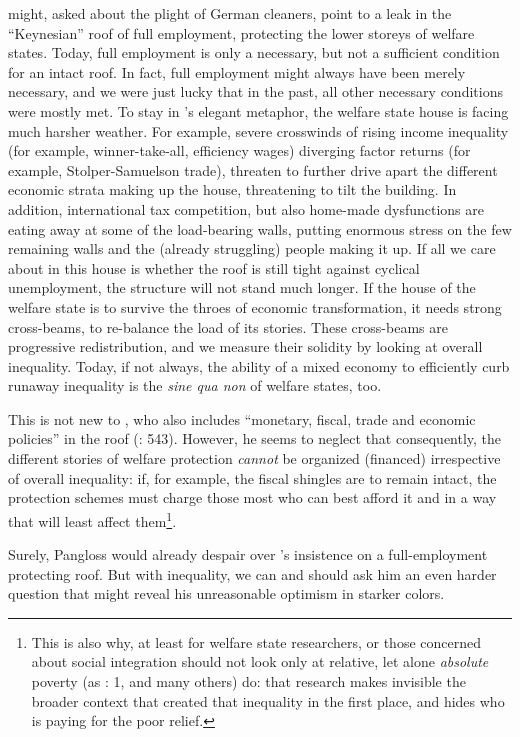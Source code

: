 \begin{enumerate}
	\citeauthor{Offe2003} might, asked about the plight of German cleaners, point to a leak in the ``Keynesian'' roof of full employment, protecting the lower storeys of welfare states. Today, full employment is only a necessary, but not a sufficient condition for an intact roof. In fact, full employment might always have been merely necessary, and we were just lucky that in the past, all other necessary conditions were mostly met. To stay in \citeauthor{Offe2003}'s elegant metaphor, the welfare state house is facing much harsher weather. For example, severe crosswinds of rising income inequality (for example, winner-take-all, efficiency wages) diverging factor returns (for example, Stolper-Samuelson trade), threaten to further drive apart the different economic strata making up the house, threatening to tilt the building. In addition, international tax competition, but also home-made dysfunctions are eating away at some of the load-bearing walls, putting enormous stress on the few remaining walls and the (already struggling) people making it up. If all we care about in this house is whether the roof is still tight against cyclical unemployment, the structure will not stand much longer. If the house of the welfare state is to survive the throes of economic transformation, it needs strong cross-beams, to re-balance the load of its stories. These cross-beams are progressive redistribution, and we measure their solidity by looking at overall inequality. Today, if not always, the ability of a mixed economy to efficiently curb runaway inequality is the \emph{sine qua non} of welfare states, too. 
	
	This is not new to \cite{Offe2003}, who also includes ``monetary, fiscal, trade and economic policies'' in the roof (\citeyear{Offe2003}: 543). However, he seems to neglect that consequently, the different stories of welfare protection \emph{cannot} be organized (financed) irrespective of overall inequality: if, for example, the fiscal shingles are to remain intact, the protection schemes must charge those most who can best afford it and in a way that will least affect them\footnote{
		This is also why, at least for welfare state researchers, or those concerned about social integration should not look only at relative, let alone \emph{absolute} poverty (as \citealt{Grow2005}: 1, and many others) do: that research makes invisible the broader context that created that inequality in the first place, and hides who is paying for the poor relief.}. 
	
	Surely, Pangloss would already despair over \cite{Offe2003}'s insistence on a full-employment protecting roof. But with inequality, we can and should ask him an even harder question that might reveal his unreasonable optimism in starker colors.
	

\end{enumerate}
